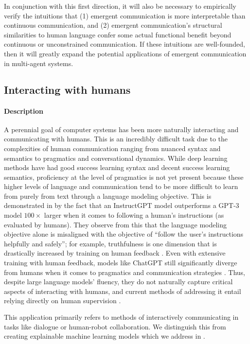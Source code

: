 In conjunction with this first direction, it will also be necessary to empirically verify the intuitions that (1) emergent communication is more interpretable than continuous communication, and (2) emergent communication's structural similarities to human language confer some actual functional benefit beyond continuous or unconstrained communication.
If these intuitions are well-founded, then it will greatly expand the potential applications of emergent communication in multi-agent systems.


\subsection{Interacting with humans}%
\label{sec:rev-interacting-humans}
\paragraph{Description}
A perennial goal of computer systems has been more naturally interacting and communicating with humans.
This is an incredibly difficult task due to the complexities of human communication ranging from nuanced syntax and semantics to pragmatics and conversational dynamics.
While deep learning methods have had good success learning syntax and decent success learning semantics, proficiency at the level of pragmatics is not yet present because these higher levels of language and communication tend to be more difficult to learn from purely from text through a language modeling objective.
This is demonstrated in \citet{instructgpt} by the fact that an InstructGPT model outperforms a GPT-3 model $100{\times}$ larger when it comes to following a human's instructions (as evaluated by humans).
They observe from this that the language modeling objective alone is misaligned with the objective of ``follow the user's instructions helpfully and safely''; for example, truthfulness is one dimension that is drastically increased by training on human feedback \citep{instructgpt}.
Even with extensive training with human feedback, models like ChatGPT still significantly diverge from humans when it comes to pragmatics and communication strategies \citep{qiu2023pragmatic,guo2023close}.
Thus, despite large language models' fluency, they do not naturally capture critical aspects of interacting with humans, and current methods of addressing it entail relying directly on human supervision \citep{instructgpt}.

This application primarily refers to methods of interactively communicating in tasks like dialogue or human-robot collaboration.
We distinguish this from creating explainable machine learning models which we address in .


